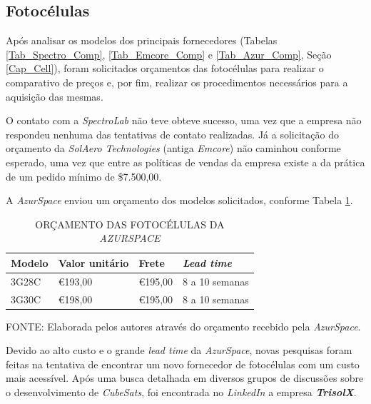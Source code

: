 \documentclass[
	12pt,				%
	openright,			%
	oneside,			%
	a4paper,			%
	english,			%
	french,				%
	spanish,			%
	brazil,				%
	oldfontcommands
	]{abntex2}
\begin{document}
\subsection[Fotocélulas]{Fotocélulas}\label{Sec_Cell}

	Após analisar os modelos dos principais fornecedores (Tabelas \ref{Tab_Spectro_Comp}, \ref{Tab_Emcore_Comp} e \ref{Tab_Azur_Comp}, Seção \ref{Cap_Cell}), foram solicitados orçamentos das fotocélulas para realizar o comparativo de preços e, por fim, realizar os procedimentos necessários para a aquisição das mesmas.
	
	O contato com a \textit{SpectroLab} não teve obteve sucesso, uma vez que a empresa não respondeu nenhuma das tentativas de contato realizadas. Já a solicitação do orçamento da \textit{SolAero Technologies} (antiga \textit{Emcore}) não caminhou conforme esperado, uma vez que entre as políticas de vendas da empresa existe a da prática de um pedido mínimo de \$7.500,00.
	
	A \textit{AzurSpace} enviou um orçamento dos modelos solicitados, conforme Tabela \ref{Tab_Orc_Cell}.
	
	\begin{table}[th]
	\caption{ORÇAMENTO DAS FOTOCÉLULAS DA \textit{AZURSPACE}}
	\label{Tab_Orc_Cell}
	\centering
	\begin{tabular}{p{3.0cm}|p{3.0cm}|p{3.0cm}|p{3.0cm}}
		\textbf{Modelo} & \textbf{Valor unitário} & \textbf{Frete} & \textit{\textbf{Lead time}}\\
		\hline
		3G28C & \euro 193,00 & \euro 195,00 & 8 a 10 semanas\\
		3G30C & \euro 198,00 & \euro 195,00 & 8 a 10 semanas\\

	\end{tabular}
	
	\begin{small}
	\vspace{3pt}
		FONTE: Elaborada pelos autores através do orçamento recebido pela \textit{AzurSpace}.
	\end{small}
	\end{table}	
	
	Devido ao alto custo e o grande \textit{lead time} da \textit{AzurSpace}, novas pesquisas foram feitas na tentativa de encontrar um novo fornecedor de fotocélulas com um custo mais acessível. Após uma busca detalhada em diversos grupos de discussões sobre o desenvolvimento de \textit{CubeSats}, foi encontrada no \textit{LinkedIn} a empresa \textbf{\textit{TrisolX}}.
	
\end{document}
